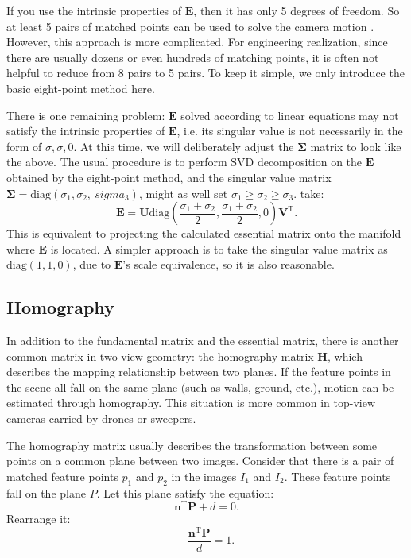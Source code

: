 If you use the intrinsic properties of $\bm{E}$, then it has only 5 degrees of freedom. So at least 5 pairs of matched points can be used to solve the camera motion \textsuperscript{\cite{Li2006, Nister2004a}}. However, this approach is more complicated. For engineering realization, since there are usually dozens or even hundreds of matching points, it is often not helpful to reduce from 8 pairs to 5 pairs. To keep it simple, we only introduce the basic eight-point method here.

There is one remaining problem: $\bm{E}$ solved according to linear equations may not satisfy the intrinsic properties of $\bm{E}$, i.e. its singular value is not necessarily in the form of ${\sigma}, {\sigma}, 0$. At this time, we will deliberately adjust the $\bm{\Sigma}$ matrix to look like the above. The usual procedure is to perform SVD decomposition on the $\bm{E}$ obtained by the eight-point method, and the singular value matrix $\bm{\Sigma} = \mathrm{diag} (\sigma_1, \sigma_2, \ sigma_3)$, might as well set $\sigma_1 \geqslant \sigma_2 \geqslant \sigma_3$. take:
\begin{equation}
\bm{E} = \bm{U} \mathrm{diag} (\frac{\sigma_1+\sigma_2}{2}, \frac{\sigma_1+\sigma_2}{2}, 0) \bm{V}^\mathrm{T}.
\end{equation}
This is equivalent to projecting the calculated essential matrix onto the manifold where $\bm{E}$ is located. A simpler approach is to take the singular value matrix as $\mathrm{diag} (1,1,0)$, due to $\bm{E}$'s scale equivalence, so it is also reasonable.

\subsection{Homography}
In addition to the fundamental matrix and the essential matrix, there is another common matrix in two-view geometry: the homography matrix $\bm{H}$, which describes the mapping relationship between two planes. If the feature points in the scene all fall on the same plane (such as walls, ground, etc.), motion can be estimated through homography. This situation is more common in top-view cameras carried by drones or sweepers. 

The homography matrix usually describes the transformation between some points on a common plane between two images. Consider that there is a pair of matched feature points $p_{1}$ and $p_{2}$ in the images $I_{1}$ and $I_{2}$. These feature points fall on the plane $P$. Let this plane satisfy the equation:
\begin{equation}
\bm{n}^\mathrm{T} \bm{P} + d = 0.
\end{equation}
Rearrange it:
\begin{equation}
- \frac{\bm{n}^\mathrm{T} \bm{P} }{d} = 1.
\end{equation}

